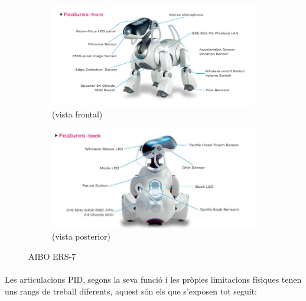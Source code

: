 \documentclass[12pt,a4paper,final,twoside]{article}
\begin{document}
\begin{figure}[h!]
	\centering
        \begin{subfigure}[b]{0.5\textwidth}
                \includegraphics[width=\textwidth]{Imatges/ERS-7(front)}
                \caption{(vista frontal)}
        \end{subfigure}%
        \begin{subfigure}[b]{0.5\textwidth}
                \includegraphics[width=\textwidth]{Imatges/ERS-7(back)}
                \caption{(vista posterior)}
        \end{subfigure}
        \caption{AIBO ERS-7 \cite{Aibo_Images}}
\end{figure}

\paragraph{}Les articulacions PID, segons la seva funció i les pròpies limitacions físiques tenen uns rangs de treball diferents, aquest són els que s'exposen tot seguit: 
\end{document}
